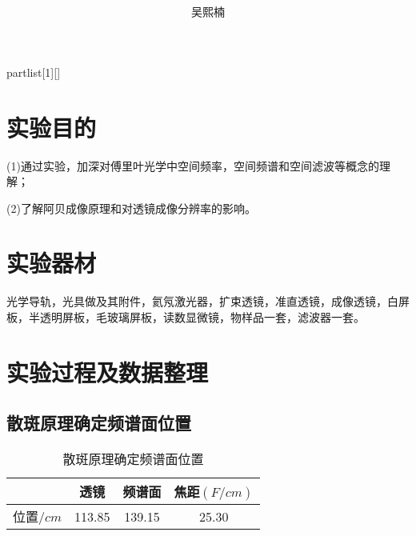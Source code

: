 \documentclass[UTF8]{ctexart}
\author{
	吴熙楠}
\title{
	\heiti{阿贝成像原理和空间滤波}
}
\begin{document}
	\maketitle
	\newtheorem{definition}{定义}[subsection]
	\newtheorem{function}{公式}[subsection]
	\newtheorem{summary}{小结}[subsection]
	\newtheorem{deduction}{推论}[subsection]
	\newtheorem{property}{性质}[subsection]
	\newtheorem{theo}{定理}[subsection]
	\newtheorem{step}{步骤}[subsection]
	\newtheorem{remark}{注记}[subsection]
	\newtheorem{proof}{证明}[subsection]
	\newenvironment{Theorem}[1][]{\par\noindent\textbf{定理}(#1)\quad}{\par}
	\newcommand{\rbra}[1]{\left( #1 \right)}
	\newcommand{\sbra}[1]{\left[ #1 \right]}
	\newcommand{\cbra}[1]{\left\{ #1 \right\}}
	\newcommand{\pbra}[1]{\left< #1 \right>}
	\newcommand{\abs}[1]{\left| #1 \right|}
	\newcommand{\fs}[2]{\displaystyle\frac{#1}{#2}}
	
	\newenvironment{myproof}{{\color{blue}证：}}
	
	\newenvironment{partlist}[1][]
	{\begin{enumerate}[itemsep=0pt, label=(\arabic*), wide, labelindent=\parindent, listparindent=\parindent, #1]}
		{\end{enumerate}}
	
	\renewcommand{\contentsname}{目录} %
	\newcommand{\tablecell}[2]{\begin{tabular}{@{}#1@{}}#2\end{tabular}}
	\tableofcontents
	\newpage
	\section{实验目的}
	(1)通过实验，加深对傅里叶光学中空间频率，空间频谱和空间滤波等概念的理解；
	\par(2)了解阿贝成像原理和对透镜成像分辨率的影响。
	\section{实验器材}
	光学导轨，光具做及其附件，氦氖激光器，扩束透镜，准直透镜，成像透镜，白屏板，半透明屏板，毛玻璃屏板，读数显微镜，物样品一套，滤波器一套。
	\section{实验过程及数据整理}
	\subsection{散斑原理确定频谱面位置}
	\begin{table}[H]
		\centering
		\begin{tabular}{cccc}
			\toprule[0.5mm]
			&透镜&频谱面&焦距$(F/cm)$\\
			\midrule
			位置$/cm$&113.85&139.15&25.30\\
			\bottomrule[0.5mm]
		\end{tabular}
		\caption{散斑原理确定频谱面位置}
	\end{table}
\end{document}
